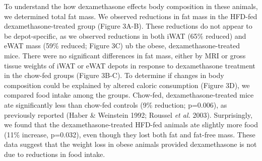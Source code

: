 \documentclass[11pt]{article} %
\begin{document}
To understand the how dexamethasone effects body composition in these
animals, we determined total fat mass. We observed reductions in fat
mass in the HFD-fed dexamethasone-treated group (Figure 3A-B). These
reductions do not appear to be depot-specific, as we observed reductions
in both iWAT (65\% reduced) and eWAT mass (59\% reduced; Figure 3C) ub
the obese, dexamethasone-treated mice. There were no significant
differences in fat mass, either by MRI or gross tissue weights of iWAT
or eWAT depots in response to dexamethasone treatment in the chow-fed
groups (Figure 3B-C). To determine if changes in body composition could
be explained by altered caloric consumption (Figure 3D), we compared
food intake among the groups. Chow-fed, dexamethasone-treated mice ate
significantly less than chow-fed controls (9\% reduction; p=0.006), as
previously reported (Haber \& Weinstein 1992; Roussel \emph{et al.}
2003). Surprisingly, we found that the dexamethasone-treated HFD-fed
animals ate slightly more food (11\% increase, p=0.032), even though
they lost both fat and fat-free mass. These data suggest that the weight
loss in obese animals provided dexamethasone is not due to reductions in
food intake.
\end{document}
